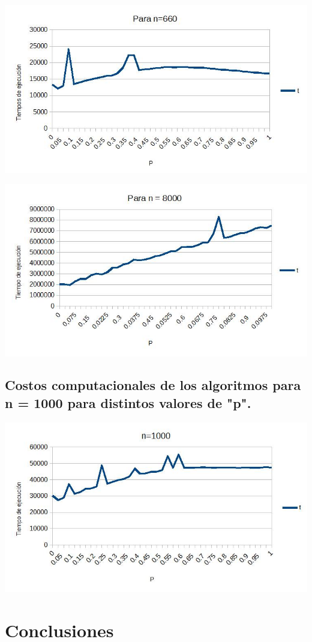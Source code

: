 \documentclass[12pt,letterpaper]{scrartcl}
\begin{document}
\includegraphics[scale=0.55]{nn}

\includegraphics[scale=0.55]{nnnn}

\subsection{Costos computacionales de los algoritmos para n = 1000 para distintos valores de "p".}

\includegraphics[scale=0.55]{nnn}

\newpage
\section{Conclusiones}
\end{document}
